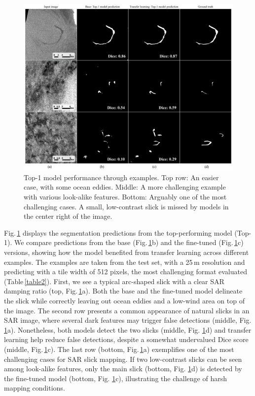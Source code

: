 \documentclass[lettersize,journal]{IEEEtran}
\begin{document}
\begin{figure}[!t]
    \centering
    \includegraphics[width=6.02in]{figures/preds4x3_v2_scale_lettering.png}
    \caption{Top-1 model performance through examples. \quad Top row: An easier case, with some ocean eddies. \quad Middle: A more challenging example with 
    various look-alike features. \quad Bottom: Arguably one of the most challenging cases. A small, low-contrast slick is missed by models in the center right of the image.}
    \label{figure3}
\end{figure}
Fig.\,\ref{figure3} displays the segmentation predictions from the top-performing model (Top-1). We compare predictions from the base (Fig.\,\ref{figure3}b) and the fine-tuned (Fig.\,\ref{figure3}c)
versions, showing how the model benefited from transfer learning across different examples. The examples are taken from the test set, with a 25\,m resolution and predicting 
with a tile width of 512 pixels, the most challenging format evaluated (Table\,\ref{table2}). First, we see a typical arc-shaped slick with a clear SAR damping ratio (top, Fig.\,\ref{figure3}a). 
Both the base and the fine-tuned model delineate the slick while correctly leaving out ocean eddies and a low-wind area on top of the image. The second row presents a common appearance of natural slicks in an SAR image, 
where several dark features may trigger false detections (middle, Fig. \ref{figure3}a). Nonetheless, both models detect the two slicks (middle, Fig. \ref{figure3}d) and transfer learning 
help reduce false detections, despite a somewhat undervalued Dice score (middle, Fig.\,\ref{figure3}c). The last row (bottom, Fig.\,\ref{figure3}a) exemplifies one of the most challenging cases for SAR slick mapping. 
If two low-contrast slicks can be seen among look-alike features, only the main slick (bottom, Fig. \ref{figure3}d) is detected by the fine-tuned model (bottom, Fig. \ref{figure3}c), illustrating the challenge of 
harsh mapping conditions. 
\end{document}
